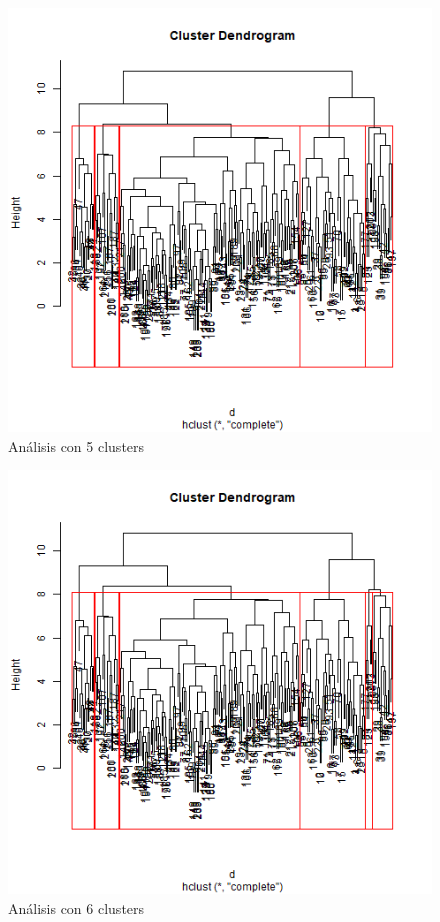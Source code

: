 \documentclass[a4paper,10pt,twocolumn]{article}
\begin{document}
\begin{figure}[htb]%
	\begin{center}
		\includegraphics[width=\linewidth]{hier_cluster_5_euclidean}
	\end{center}
	\caption{Análisis con 5 clusters \label{fig:hier_cluster_5_euclidean}}%
\end{figure}

\begin{figure}[htb]%
	\begin{center}
		\includegraphics[width=\linewidth]{hier_cluster_6_euclidean}
	\end{center}
	\caption{Análisis con 6 clusters \label{fig:hier_cluster_6_euclidean}}%
\end{figure}
\end{document}
